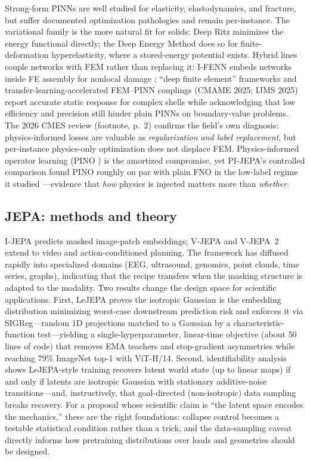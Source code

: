 \documentclass[11pt]{article}
\begin{document}
Strong-form PINNs \cite{raissi2019} are well studied for elasticity,
elastodynamics, and fracture, but suffer documented optimization pathologies
\cite{krishnapriyan2021,wang2022ntk} and remain per-instance. The variational
family is the more natural fit for solids: Deep Ritz \cite{e2018ritz}
minimizes the energy functional directly; the Deep Energy Method
\cite{samaniego2020,nguyen2020dem} does so for finite-deformation
hyperelasticity, where a stored-energy potential exists. Hybrid lines couple
networks with FEM rather than replacing it: I-FENN embeds networks inside FE
assembly for nonlocal damage \cite{pantidis2023ifenn}; ``deep finite element''
frameworks and transfer-learning-accelerated FEM--PINN couplings (CMAME 2025;
IJMS 2025) report accurate static response for complex shells while
acknowledging that low efficiency and precision still hinder plain PINNs on
boundary-value problems. The 2026 CMES review (footnote, p.~2) confirms the
field's own diagnosis: physics-informed losses are valuable as
\emph{regularization and label replacement}, but per-instance physics-only
optimization does not displace FEM. Physics-informed operator learning (PINO
\cite{li2024pino}) is the amortized compromise, yet PI-JEPA's controlled
comparison found PINO roughly on par with plain FNO in the low-label regime it
studied \cite{yee2026pijepa}---evidence that \emph{how} physics is injected
matters more than \emph{whether}.

\subsection{JEPA: methods and theory}

I-JEPA \cite{assran2023ijepa} predicts masked image-patch embeddings; V-JEPA
\cite{bardes2024vjepa} and V-JEPA~2 \cite{meta2025vjepa2} extend to video and
action-conditioned planning. The framework has diffused rapidly into
specialized domains (EEG, ultrasound, genomics, point clouds, time series,
graphs), indicating that the recipe transfers when the masking structure is
adapted to the modality. Two results change the design space for scientific
applications. First, LeJEPA \cite{balestriero2025lejepa} proves the isotropic
Gaussian is the embedding distribution minimizing worst-case downstream
prediction risk and enforces it via SIGReg---random 1D projections matched to
a Gaussian by a characteristic-function test---yielding a single-hyperparameter,
linear-time objective (about 50 lines of code) that removes EMA teachers and
stop-gradient asymmetries while reaching 79\% ImageNet top-1 with ViT-H/14.
Second, identifiability analysis \cite{klindt2026} shows LeJEPA-style training
recovers latent world state (up to linear maps) if and only if latents are
isotropic Gaussian with stationary additive-noise transitions---and,
instructively, that goal-directed (non-isotropic) data sampling breaks
recovery. For a proposal whose scientific claim is ``the latent space encodes
the mechanics,'' these are the right foundations: collapse control becomes a
testable statistical condition rather than a trick, and the data-sampling
caveat directly informs how pretraining distributions over loads and
geometries should be designed.
\end{document}
